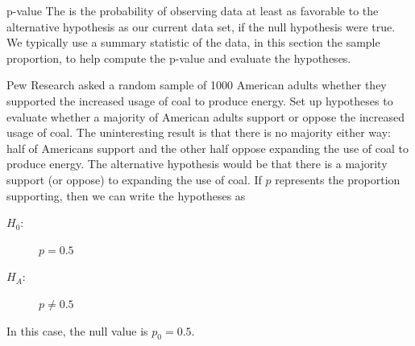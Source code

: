 \begin{onebox}{p-value}
  The 
  is the probability of observing data at least as favorable
  to the alternative hypothesis as our current data set,
  if the null hypothesis were true. We typically use a summary
  statistic of the data, in this section the sample proportion,
  to help compute the p-value and evaluate the hypotheses.
\end{onebox}



\begin{examplewrap}
\begin{nexample}{Pew Research asked a random sample of 1000 American
    adults whether they supported the increased usage of coal to
    produce energy.
    Set up hypotheses to evaluate whether
    a majority of American adults support or oppose
    the increased usage of coal.}
  The uninteresting result is that there is no majority either way:
  half of Americans support and the other half oppose expanding the
  use of coal to produce energy. The alternative hypothesis would
  be that there is a majority support (or oppose) to expanding the
  use of coal. If $p$ represents the proportion supporting, then
  we can write the hypotheses as
  \begin{description}
    \item[$H_0$:] $p = 0.5$
    \item[$H_A$:] $p \neq 0.5$
  \end{description}
  In this case, the null value is $p_0 = 0.5$.
\end{nexample}
\end{examplewrap}

\newcommand{\pewcoalpollsize}{1000}
\newcommand{\pewcoalpollprop}{0.370}
\newcommand{\pewcoalpollpropcomplement}{0.630}
\newcommand{\pewcoalpollpercent}{37.0}
\newcommand{\pewcoalpollpercentcomplement}{63.0}
\newcommand{\pewcoalpollcount}{370}
\newcommand{\pewcoalpollcountcomplement}{630}
\newcommand{\pewcoalpollse}{0.0153}
\newcommand{\pewcoalpollnullvalue}{0.5}
\newcommand{\pewcoalpollnullse}{0.016}

